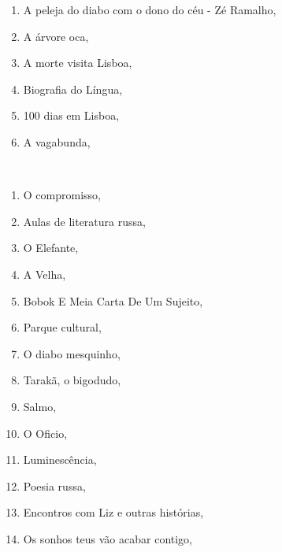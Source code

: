 \begin{multicols}{2}
\begin{enumerate}
\item A peleja do diabo com o dono do céu - Zé Ramalho, {}
\item A árvore oca, {}
\item A morte visita Lisboa, {}
\item Biografia do Língua, {}
\item 100 dias em Lisboa, {}
\item A vagabunda, {}
\end{enumerate}
\end{multicols}

\medskip

{}\\

\begin{multicols}{2}
\begin{enumerate}
\item O compromisso, {}
\item Aulas de literatura russa, {}
\item O Elefante, {}
\item A Velha, {}
\item Bobok E Meia Carta De Um Sujeito, {}
\item Parque cultural, {}
\item O diabo mesquinho, {}
\item Tarakã, o bigodudo, {}
\item Salmo, {}
\item O Oficio, {}
\item Luminescência, {}
\item Poesia russa, {}
\item Encontros com Liz e outras histórias, {}
\item Os sonhos teus vão acabar contigo, {}
\end{enumerate}
\end{multicols}

